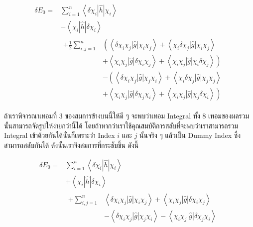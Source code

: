 \begin{equation}
    \begin{aligned}
        \delta E_0 
        = & \sum_{i=1}^n\left\langle\delta \chi_i|\hat{h}| \chi_i\right\rangle \\
            & +\left\langle\chi_i|\hat{h}| \delta \chi_i\right\rangle \\
            & \begin{aligned} +\frac{1}{2} \sum_{i, j=1}^n 
                & \left( \right. \left\langle\delta \chi_i \chi_j|\hat{g}| \chi_i \chi_j\right\rangle 
                +\left\langle\chi_i \delta \chi_j|\hat{g}| \chi_i \chi_j\right\rangle \\
                & +\left\langle\chi_i \chi_j|\hat{g}| \delta \chi_i \chi_j\right\rangle 
                +\left\langle\chi_i \chi_j|\hat{g}| \chi_i \delta \chi_j\right\rangle \left. \right) \\
                & -\left(\left\langle\delta \chi_i \chi_j|\hat{g}| \chi_j \chi_i\right\rangle \right. 
                +\left\langle\chi_i \delta \chi_j|\hat{g}| \chi_j \chi_j\right\rangle \\
                & +\left\langle\chi_i \chi_j|\hat{g}| \delta \chi_j \chi_i\right\rangle 
                +\left\langle\chi_i \chi_j|\hat{g}| \chi_j \delta \chi_i\right\rangle \left. \right)
            \end{aligned} 
    \end{aligned}
\end{equation}

\noindent ถ้าเราพิจารณาเทอมที่ 3 ของสมการข้างบนนี้ให้ดี ๆ จะพบว่าเทอม Integral ทั้ง 8 เทอมของผลรวมนั้นสามารถจัดรูปให้ง่ายกว่านี้ได้ 
โดยถ้าหากว่าเราใช้คุณสมบัติการสลับที่จะพบว่าเราสามารถรวม Integral เข้าด้วยกันได้นั่นก็เพราะว่า Index $i$ และ $j$ นั้นจริง ๆ แล้วเป็น 
Dummy Index ซึ่งสามารถสลับกันได้ ดังนั้นเราจึงสมการที่กระชับขึ้น ดังนี้

\begin{equation}
    \label{eq:small_variation_energy}
    \begin{aligned}
        \delta E_0 
        = & \sum_{i=1}^n\left\langle\delta \chi_i|\hat{h}| \chi_i\right\rangle \\
            & +\left\langle\chi_i|\hat{h}| \delta \chi_i\right\rangle \\
            & \begin{aligned} +\sum_{i, j=1}^n
                & \left\langle \delta \chi_i \chi_j|\hat{g}| \chi_i \chi_j\right\rangle 
                +\left\langle\chi_i \chi_j|\hat{g}| \delta \chi_i \chi_j\right\rangle \\
                & -\left\langle\delta \chi_i \chi_j|\hat{g}| \chi_j \chi_i\right\rangle 
                -\left\langle\chi_i \chi_j|\hat{g}| \delta \chi_j \chi_i\right\rangle
            \end{aligned}
    \end{aligned}
\end{equation}

